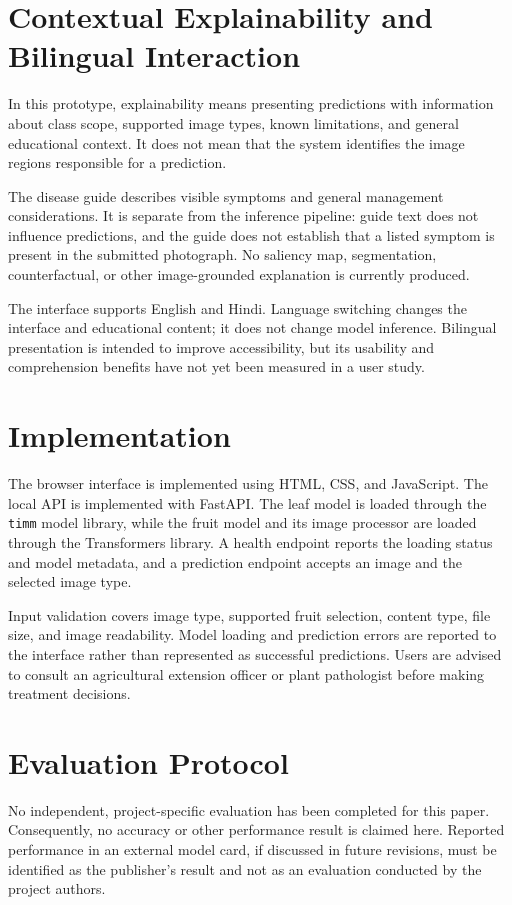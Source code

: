 \documentclass[conference]{IEEEtran}
\begin{document}
\section{Contextual Explainability and Bilingual Interaction}
In this prototype, explainability means presenting predictions with information about class scope, supported image types, known limitations, and general educational context. It does not mean that the system identifies the image regions responsible for a prediction.

The disease guide describes visible symptoms and general management considerations. It is separate from the inference pipeline: guide text does not influence predictions, and the guide does not establish that a listed symptom is present in the submitted photograph. No saliency map, segmentation, counterfactual, or other image-grounded explanation is currently produced.

The interface supports English and Hindi. Language switching changes the interface and educational content; it does not change model inference. Bilingual presentation is intended to improve accessibility, but its usability and comprehension benefits have not yet been measured in a user study.

\section{Implementation}
The browser interface is implemented using HTML, CSS, and JavaScript. The local API is implemented with FastAPI. The leaf model is loaded through the \texttt{timm} model library, while the fruit model and its image processor are loaded through the Transformers library. A health endpoint reports the loading status and model metadata, and a prediction endpoint accepts an image and the selected image type.

Input validation covers image type, supported fruit selection, content type, file size, and image readability. Model loading and prediction errors are reported to the interface rather than represented as successful predictions. Users are advised to consult an agricultural extension officer or plant pathologist before making treatment decisions.

\section{Evaluation Protocol}
No independent, project-specific evaluation has been completed for this paper. Consequently, no accuracy or other performance result is claimed here. Reported performance in an external model card, if discussed in future revisions, must be identified as the publisher's result and not as an evaluation conducted by the project authors.
\end{document}
